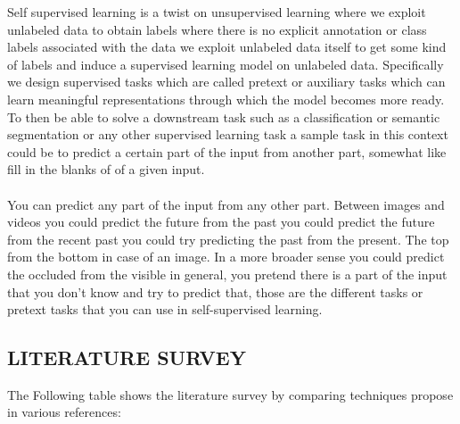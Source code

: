 \documentclass[a4paper, 12pt]{article}
\begin{document}
\hspace{1.5cm}
Self supervised
learning is a twist
on unsupervised learning where we
exploit unlabeled data to obtain
labels where there is no explicit annotation
or class labels associated with the data
we exploit unlabeled data itself to get
some kind of labels and induce a
supervised
learning model on unlabeled data.
Specifically we design supervised tasks
which are called pretext or auxiliary
tasks
which can learn meaningful
representations
through which the model becomes more
ready.
To then be able to solve a downstream
task
such as a classification or semantic
segmentation
or any other supervised learning task a
sample task in this context
could be to predict a certain part of
the input
from another part, somewhat like fill in
the blanks
of of a given input.\\
\\
You can predict any part of the input
from any other part.
Between images and videos you could
predict
the future from the past you could
predict the future from the recent
past you could try predicting the past
from the present.
The top from the bottom in case of an
image.
In a more broader sense you could
predict the occluded
from the visible in general, you pretend
there is a part of the input that you
don't know
and try to predict that,
those are the different tasks or pretext
tasks that you can use
in self-supervised learning.

\newpage
\begin{center}

\section{LITERATURE SURVEY}

\end{center}

The Following table shows the literature survey by comparing techniques propose in various references:
\end{document}
